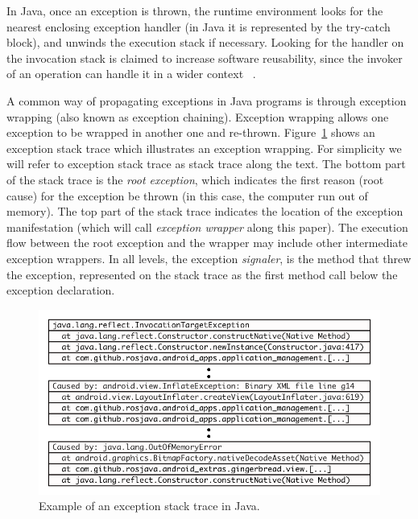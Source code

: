 \documentclass[conference]{IEEEtran}
\begin{document}

In Java, once an exception is thrown, the runtime environment looks for the nearest enclosing exception handler
(in Java it is represented by the try-catch block), and unwinds the execution stack if necessary.
 Looking for the handler on the invocation stack is claimed to increase software reusability, 
since the invoker of an operation can handle it in a wider context ~\cite{miller1997issues}.

 A common way of  propagating exceptions in Java programs is through exception wrapping
 (also known as exception chaining). Exception wrapping allows one exception 
to be wrapped in another one and re-thrown. Figure~\ref{fig:wrapping} shows 
an exception stack trace which illustrates an exception wrapping. 
For simplicity we will refer to exception stack trace as stack trace along the text.
The bottom part of the stack trace is the \emph{root exception}, which indicates
the first reason (root cause) for the exception be thrown (in this case, the computer run out of
memory). The top part of the stack trace indicates the location of the exception
manifestation (which will call \emph{exception wrapper} along this paper). The
execution flow  between the root exception and the wrapper may
include other intermediate exception wrappers. In all levels, the exception
\emph{signaler}, is the method that threw the exception, represented on the
stack trace as the first method call below the exception declaration.

\begin{figure} \centering \includegraphics[scale=0.6]{stacktrace_bw.png}
\caption{Example of an exception stack trace in Java.}
\label{fig:wrapping}
\end{figure}
\end{document}
